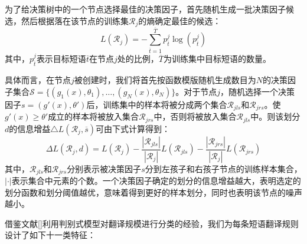 为了给决策树中的一个节点选择最佳的决策因子，首先随机生成一批决策因子候选，然后根据落在该节点的训练集$\mathcal{R}_j$的熵确定最佳的候选：
\begin{equation}
L(\mathcal{R}_j)=-\sum_{\overline{t}=1}^{\overline{T}} p_{\overline{t}}^j \log(p_{\overline{t}}^j)
\end{equation}
其中，$p_{\overline{t}}^{j}$表示目标短语$\overline{t}$在节点$j$处的比例，$\overline{T}$为训练集中目标短语的数量。

具体而言，在节点$j$被创建时，我们将首先按函数模版随机生成数目为$N$的决策因子集合$\mathcal{S} = \{(g_1(x), \theta_1), \ldots, (g_N(x), \theta_N)\}$。对于节点$j$，随机选择一个决策因子$s=(g'(x),\theta')$后，训练集中的样本将被分成两个集合$\mathcal{R}_{jls}$和$\mathcal{R}_{jrs}$。使$g'(x)\ge \theta'$成立的样本将被放入集合$\mathcal{R}_{jrs}$中，否则将被放入集合$\mathcal{R}_{jls}$中。则该划分$d$的信息增益$\triangle L(\mathcal{R}_j,\overline{s})$可由下式计算得到：
\begin{equation}
\Delta L(\mathcal{R}_j,d) = L(\mathcal{R}_j) - \frac{|\mathcal{R}_{jls}|}{|\mathcal{R}_j|}L(\mathcal{R}_{jls}) - \frac{|\mathcal{R}_{jrs}|}{|\mathcal{R}_j|}L(\mathcal{R}_{jrs})
\end{equation}
其中，$\mathcal{R}_{jls}$和$\mathcal{R}_{jrs}$分别表示被决策因子$s$分到左孩子和右孩子节点的训练样本集合，$|\cdot|$表示集合中元素的个数。一个决策因子确定的划分的信息增益越大，表明选定的划分函数和划分阈值越优，意味着得到更好的样本划分，同时也表明该节点的噪声越小。

借鉴文献[\cite{He:2008,LiuQun:2008}]利用判别式模型对翻译规模进行分类的经验，我们为每条短语翻译规则设计了如下十一类特征：

